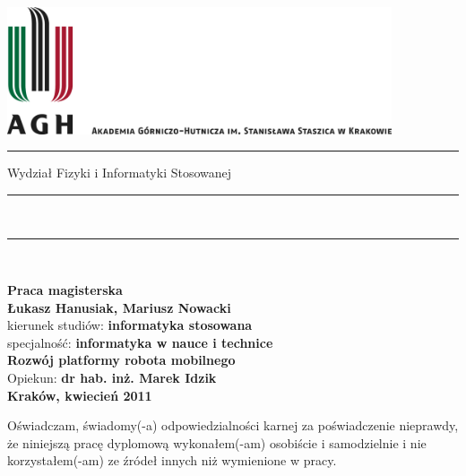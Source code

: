 \documentclass[a4paper,12pt, oneside]{mwbk}
\begin{document}
\thispagestyle{empty}
\includegraphics[height=37.5mm]{../images/agh_nzw_a_pl_1w_wbr_rgb_150ppi.jpg}\\
\rule{30mm}{0pt}
{\large \textsf{Wydział Fizyki i Informatyki Stosowanej}}\\
\rule{\textwidth}{3pt}\\
\rule[2ex]
{\textwidth}{1pt}\\
\vspace{7ex}
\begin{center}
{\LARGE \bf \textsf{Praca magisterska}}\\
\vspace{13ex}
{\bf \Large \textsf{Łukasz Hanusiak, Mariusz Nowacki}}\\
\vspace{3ex}
{\sf\small kierunek studiów:} {\bf\small \textsf{informatyka stosowana}}\\
\vspace{1.5ex}
{\sf\small specjalność:} {\bf\small \textsf{informatyka w nauce i technice}}\\
\vspace{10ex}
{\bf \huge \textsf{Rozwój platformy robota mobilnego}}\\
\vspace{14ex}
{\Large Opiekun: \bf \textsf{dr hab. inż. Marek Idzik}}\\
\vspace{22ex}
{\large \bf \textsf{Kraków, kwiecień 2011}}
\end{center}

\newpage

{\sf Oświadczam, świadomy(-a) odpowiedzialności karnej za poświadczenie nieprawdy, że niniejszą pracę dyplomową wykonałem(-am) osobiście i samodzielnie i  nie korzystałem(-am) ze źródeł innych niż wymienione w pracy.}
\end{document}

